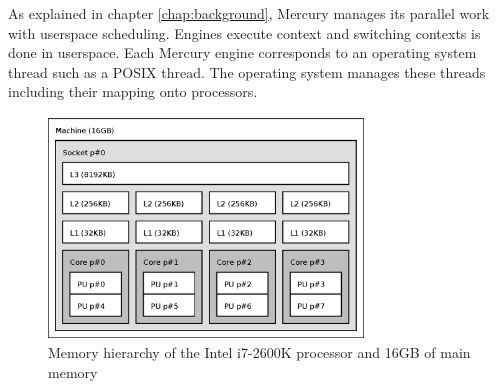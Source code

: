 

As explained in chapter \ref{chap:background},
Mercury manages its parallel work with userspace scheduling.
Engines execute context and switching contexts is done in userspace.
Each Mercury engine corresponds to an operating system thread such as a
POSIX thread.
The operating system manages these threads including their mapping onto
processors.

\begin{figure}
\begin{center}
\includegraphics[width=0.75\textwidth]{i7-hierarchy}
\end{center}
\caption{Memory hierarchy of the Intel i7-2600K processor and 16GB of main
memory}
\label{fig:i7_hierarchy}
\end{figure}

